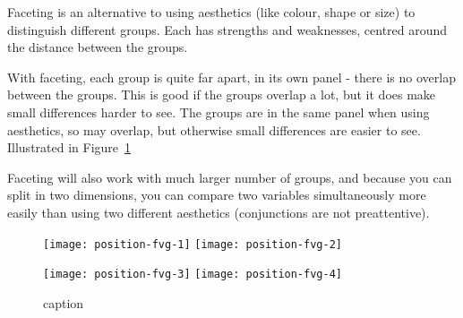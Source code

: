 Faceting is an alternative to using aesthetics (like colour, shape or size) to distinguish different groups.  Each has strengths and weaknesses, centred around the distance between the groups.

With faceting, each group is quite far apart, in its own panel - there is no overlap between the groups.  This is good if the groups overlap a lot, but it does make small differences harder to see.  The groups are in the same panel when using aesthetics, so may overlap, but otherwise small differences are easier to see.  Illustrated in Figure~\ref{fig:facet-vs-groups}

Faceting will also work with much larger number of groups, and because you can split in two dimensions, you can compare two variables simultaneously more easily than using two different aesthetics (conjunctions are not preattentive).

\begin{figure}[htbp]
  \centering
    \texttt{[image: position-fvg-1]}
    \texttt{[image: position-fvg-2]}

    \texttt{[image: position-fvg-3]}
    \texttt{[image: position-fvg-4]}
  \caption{caption}
  \label{fig:facet-vs-groups}
\end{figure}


% 
% 
% 
% 
% 
% 

